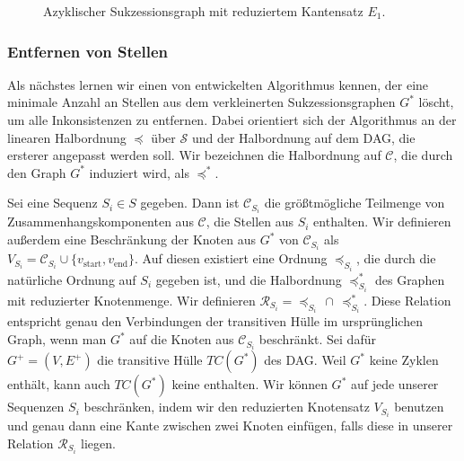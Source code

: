 \begin{figure}
\begin{center}
\end{center}
\caption{Azyklischer Sukzessionsgraph mit reduziertem Kantensatz $E_1$.}\label{bsp:del_kanten}
\end{figure}

\subsubsection{Entfernen von Stellen}

Als nächstes lernen wir einen von \cite{pdc10} entwickelten Algorithmus kennen, der eine minimale Anzahl an Stellen aus dem verkleinerten Sukzessionsgraphen $G^{*}$ löscht, um alle Inkonsistenzen zu entfernen. Dabei orientiert sich der Algorithmus an der linearen Halbordnung $\preceq$ über $\mathcal{S}$ und der Halbordnung auf dem DAG, die ersterer angepasst werden soll. Wir bezeichnen die Halbordnung auf $\mathcal{C}$, die durch den Graph $G^{*}$ induziert wird, als $\preceq^{*}$.

Sei eine Sequenz $S_i \in S$ gegeben. Dann ist $\mathcal{C}_{S_i}$ die größtmögliche Teilmenge von Zusammenhangskomponenten aus $\mathcal{C}$, die Stellen aus $S_i$ enthalten. Wir definieren außerdem eine Beschränkung der Knoten aus $G^{*}$ von $\mathcal{C}_{S_i}$ als $V_{S_i} = \mathcal{C}_{S_i} \cup \{v_{\mathrm{start}},v_{\mathrm{end}}\}$. Auf diesen existiert eine Ordnung $\preceq_{S_i}$, die durch die natürliche Ordnung auf $S_i$ gegeben ist, und die Halbordnung $\preceq_{S_i}^{*}$ des Graphen mit reduzierter Knotenmenge. Wir definieren $\mathcal{R}_{S_i} = \preceq_{S_i}\, \cap\, \preceq_{S_i}^{*}$. Diese Relation entspricht genau den Verbindungen der transitiven Hülle im ursprünglichen Graph, wenn man $G^{*}$ auf die Knoten aus $\mathcal{C}_{S_i}$ beschränkt. Sei dafür $G^{+} = (V,E^{+})$ die transitive Hülle $TC(G^{*})$ des DAG. Weil $G^{*}$ keine Zyklen enthält, kann auch $TC(G^{*})$ keine enthalten. Wir können $G^{*}$ auf jede unserer Sequenzen $S_i$ beschränken, indem wir den reduzierten Knotensatz $V_{S_i}$ benutzen und genau dann eine Kante zwischen zwei Knoten einfügen, falls diese in unserer Relation $\mathcal{R}_{S_i}$ liegen.

